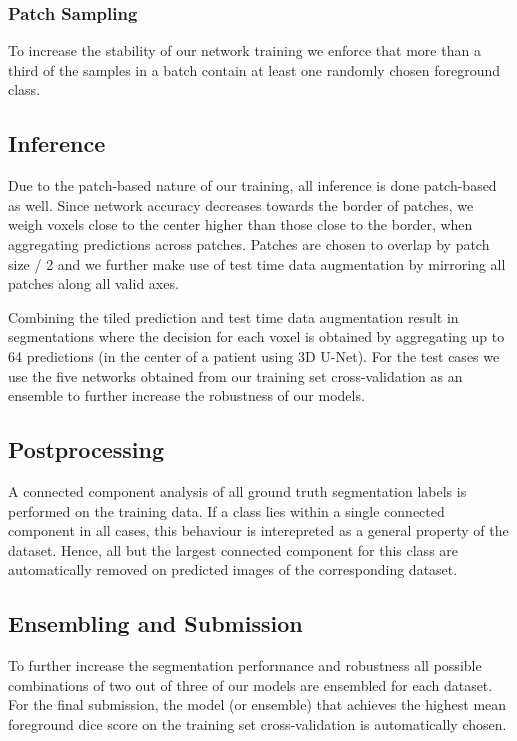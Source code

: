 \documentclass{templates/llncs}
\begin{document}
    \subsubsection{Patch Sampling}
    To increase the stability of our network training we enforce that more than a third of the samples in a batch contain at least one randomly chosen foreground class.
    
    \subsection{Inference}
    Due to the patch-based nature of our training, all inference is done patch-based as well. Since network accuracy decreases towards the border of patches, we weigh voxels close to the center higher than those close to the border, when aggregating predictions across patches. Patches are chosen to overlap by patch size / 2 and we further make use of test time data augmentation by mirroring all patches along all valid axes.
    
    Combining the tiled prediction and test time data augmentation result in segmentations where the decision for each voxel is obtained by aggregating up to 64 predictions (in the center of a patient using 3D U-Net). For the test cases we use the five networks obtained from our training set cross-validation as an ensemble to further increase the robustness of our models.
    
    \subsection{Postprocessing}
    A connected component analysis of all ground truth segmentation labels is performed on the training data. If a class lies within a single connected component in all cases, this behaviour is interepreted as a general property of the dataset. Hence, all but the largest connected component for this class are automatically removed on predicted images of the corresponding dataset.
    
    \subsection{Ensembling and Submission}
    To further increase the segmentation performance and robustness all possible combinations of two out of three of our models are ensembled for each dataset. For the final submission, the model (or ensemble) that achieves the highest mean foreground dice score on the training set cross-validation is automatically chosen.
\end{document}
